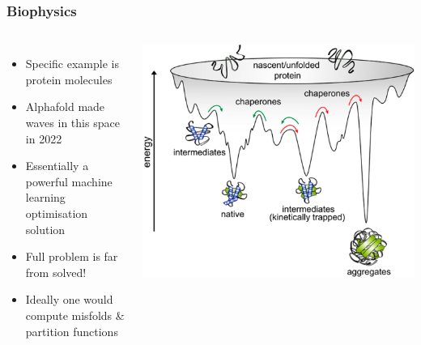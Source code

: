 \documentclass[aspectratio=169]{beamer}
\begin{document}
\begin{frame}
    \frametitle{Biophysics}
    \begin{columns}
        \begin{itemize}
            \item Specific example is protein molecules
            \item Alphafold made waves in this space in 2022
            \item Essentially a powerful machine learning optimisation solution
            \item Full problem is far from solved!
            \item Ideally one would compute misfolds \& partition functions
        \end{itemize}
        
        \includegraphics[width=\textwidth]{figures/proteins}
        
    \end{columns}
\end{frame}
\end{document}
